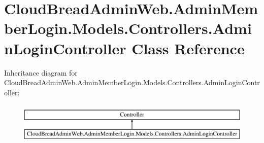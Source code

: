 \hypertarget{class_cloud_bread_admin_web_1_1_admin_member_login_1_1_models_1_1_controllers_1_1_admin_login_controller}{}\section{Cloud\+Bread\+Admin\+Web.\+Admin\+Member\+Login.\+Models.\+Controllers.\+Admin\+Login\+Controller Class Reference}
\label{class_cloud_bread_admin_web_1_1_admin_member_login_1_1_models_1_1_controllers_1_1_admin_login_controller}
Inheritance diagram for Cloud\+Bread\+Admin\+Web.\+Admin\+Member\+Login.\+Models.\+Controllers.\+Admin\+Login\+Controller\+:\begin{figure}[H]
\begin{center}
\leavevmode
\includegraphics[height=2.000000cm]{class_cloud_bread_admin_web_1_1_admin_member_login_1_1_models_1_1_controllers_1_1_admin_login_controller}
\end{center}
\end{figure}
